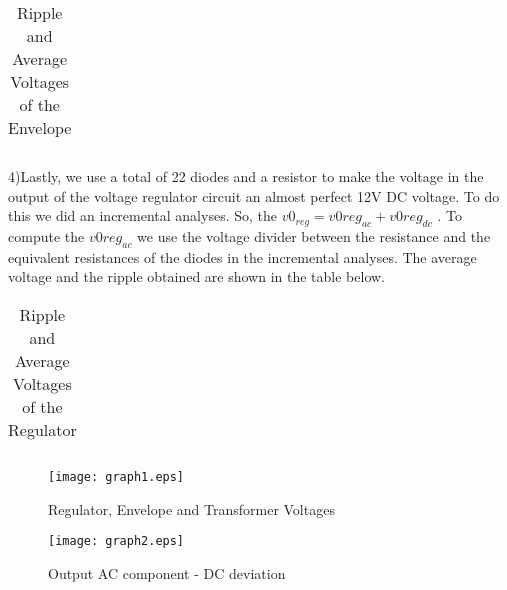  
 \par
 \begin{table}[!h]
\centering
\begin{tabularx}{0.6\textwidth} {
  | >{\raggedright\arraybackslash}X
  | >{\raggedleft\arraybackslash}X | }
 \hline

\end{tabularx}
\caption{Ripple and Average Voltages of the Envelope}
\end{table}
 \par
 4)Lastly, we use a total of 22 diodes and a resistor to make the voltage in the output of the voltage regulator circuit an almost perfect 12V DC voltage. To do this we did an incremental analyses. So, the $v0_{reg} = v0reg_{ac} + v0reg_{dc}$ . To compute the $v0reg_{ac}$ we use the voltage divider between the resistance and the equivalent resistances of the diodes in the incremental analyses. The average voltage and the ripple obtained are shown in the table below.
 
 \par 
\begin{table}[h]
\centering
\begin{tabularx}{0.6\textwidth} {
  | >{\raggedright\arraybackslash}X
  | >{\raggedleft\arraybackslash}X | }
 \hline

\end{tabularx}
\caption{Ripple and Average Voltages of the Regulator}
\end{table}
 \par

 
 \begin{figure}[!h]\centering
\texttt{[image: graph1.eps]}
\caption{Regulator, Envelope and Transformer Voltages}
\label{fig:snat}
\end{figure}

\begin{figure}[!h]\centering
\texttt{[image: graph2.eps]}
\caption{Output AC component - DC deviation}
\label{fig:snat2}
\end{figure}

